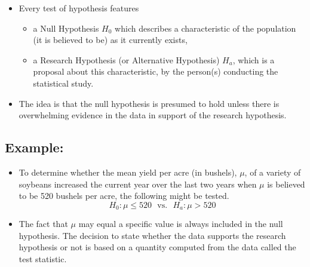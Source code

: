 \documentclass[
  letterpaper,
  DIV=11,
  numbers=noendperiod]{scrartcl}
\begin{document}
\begin{itemize}
\item
  Every test of hypothesis features

  \begin{itemize}
  \item
    a {Null Hypothesis} {\(H_0\)} which describes a characteristic of
    the population (it is believed to be) as it currently exists,\\
  \item
    a {Research Hypothesis} (or {Alternative Hypothesis}) {\(H_a\)},
    which is a proposal about this characteristic, by the person(s)
    conducting the statistical study.
  \end{itemize}
\item
  The idea is that the null hypothesis is presumed to hold unless there
  is overwhelming evidence in the data in support of the research
  hypothesis.
\end{itemize}

\subsection{Example:}\label{example-1}

\begin{itemize}
\item
  To determine whether the mean yield per acre (in bushels), \(\mu\), of
  a variety of soybeans increased the current year over the last two
  years when \(\mu\) is believed to be 520 bushels per acre, the
  following might be tested.
  \[H_0: \mu \leq 520 \ \ \ \mbox{vs.}\ \ \ H_a: \mu > 520\]
\item
  The fact that \(\mu\) may equal a specific value is always included in
  the null hypothesis. The decision to state whether the data supports
  the research hypothesis or not is based on a quantity computed from
  the data called the {test statistic}.
\end{itemize}

\subsection{}\label{section}
\end{document}
